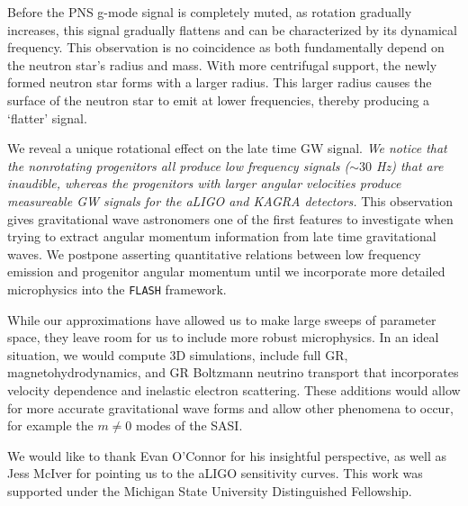 \documentclass[twocolumn,times]{aastex62}  %
\begin{document}
Before the PNS g-mode signal is completely muted, as rotation gradually increases, this signal gradually flattens and can be characterized by its dynamical frequency.  This observation is no coincidence as both  fundamentally depend on the neutron star's radius and mass.  With more centrifugal support, the newly formed neutron star forms with a larger radius.  This larger radius causes the surface of the neutron star to emit at lower frequencies, thereby producing a `flatter' signal.

We reveal a unique rotational effect on the late time GW signal.  \textit{We notice that the nonrotating progenitors all produce low frequency signals ($\sim 30$ Hz) that are inaudible, whereas the progenitors with larger angular velocities produce measureable GW signals for the aLIGO and KAGRA detectors.}  This observation gives gravitational wave astronomers one of the first features to investigate when trying to extract angular momentum information from late time gravitational waves.  We postpone asserting quantitative relations between low frequency emission and progenitor angular momentum until we incorporate more detailed microphysics into the \texttt{FLASH} framework.

While our approximations have allowed us to make large sweeps of parameter space, they leave room for us to include more robust microphysics.  In an ideal situation, we would compute 3D simulations, include full GR, magnetohydrodynamics, and GR Boltzmann neutrino transport that incorporates velocity dependence and inelastic electron scattering.  These additions would allow for more accurate gravitational wave forms and allow other phenomena to occur, for example the $m\ne 0$ modes of the SASI.

\acknowledgements

We would like to thank Evan O'Connor for his insightful perspective, as well as Jess McIver for pointing us to the aLIGO sensitivity curves.  This work was supported under the Michigan State University Distinguished Fellowship. 

    





\end{document}
